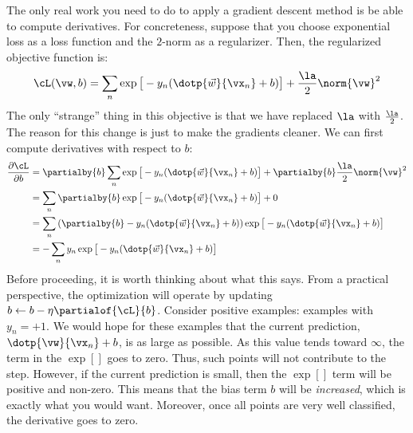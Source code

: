 The only real work you need to do to apply a gradient descent method
is be able to compute derivatives.  For concreteness, suppose that you
choose exponential loss as a loss function and the $2$-norm as a
regularizer.  Then, the regularized objective function is:
%
\begin{equation}
\cL(\vw,b) =
\sum_n
  \exp\big[-y_n (\dotp{\vec w}{\vx_n}+b)\big] +
 \frac \la 2 \norm{\vw}^2
\end{equation}
%
The only ``strange'' thing in this objective is that we have replaced
$\la$ with $\frac \la 2$.  The reason for this change is just to make
the gradients cleaner.  We can first compute derivatives with respect
to $b$:
%
\begin{align}
\frac {\partial\cL} {\partial b}
&= \partialby{b}\sum_n \exp\big[-y_n (\dotp{\vec w}{\vx_n}+b)\big] + \partialby{b}\frac \la 2 \norm{\vw}^2\\
&= \sum_n \partialby{b} \exp\big[ -y_n (\dotp{\vec w}{\vx_n}+b)\big] + 0\\
&= \sum_n \left( \partialby{b} -y_n (\dotp{\vec w}{\vx_n}+b) \right) \exp\big[ -y_n (\dotp{\vec w}{\vx_n}+b)\big]\\
&= - \sum_n y_n \exp\big[ -y_n (\dotp{\vec w}{\vx_n}+b)\big]
\end{align}
%
Before proceeding, it is worth thinking about what this says.  From a
practical perspective, the optimization will operate by updating $b
\leftarrow b - \eta \partialof{\cL}{b}$.  Consider positive examples:
examples with $y_n=+1$.  We would hope for these examples that the
current prediction, $\dotp{\vw}{\vx_n}+b$, is as large as possible.
As this value tends toward $\infty$, the term in the $\exp[]$ goes to
zero.  Thus, such points will not contribute to the step.  However, if
the current prediction is small, then the $\exp[]$ term will be
positive and non-zero.  This means that the bias term $b$ will be
\emph{increased}, which is exactly what you would want.  Moreover,
once all points are very well classified, the derivative goes to zero.


